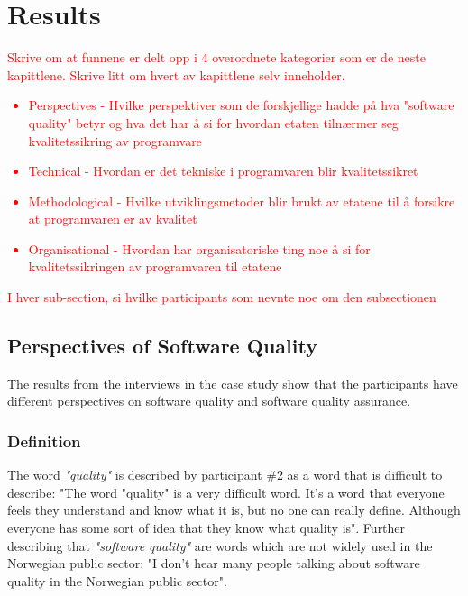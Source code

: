 \chapter{Results}

\textcolor{red}{Skrive om at funnene er delt opp i 4 overordnete kategorier som er de neste kapittlene. Skrive litt om hvert av kapittlene selv inneholder.
\begin{itemize}
    \item Perspectives - Hvilke perspektiver som de forskjellige hadde på hva "software quality" betyr og hva det har å si for hvordan etaten tilnærmer seg kvalitetssikring av programvare
    \item Technical - Hvordan er det tekniske i programvaren blir kvalitetssikret
    \item Methodological - Hvilke utviklingsmetoder blir brukt av etatene til å forsikre at programvaren er av kvalitet
    \item Organisational - Hvordan har organisatoriske ting noe å si for kvalitetssikringen av programvaren til etatene
\end{itemize}
}

\textcolor{red}{I hver sub-section, si hvilke participants som nevnte noe om den subsectionen}

\section{Perspectives of Software Quality}
The results from the interviews in the case study show that the participants have different perspectives on software quality and software quality assurance.

\subsection{Definition}
The word \textit{"quality"} is described by participant \#2 as a word that is difficult to describe: "The word "quality" is a very difficult word. It's a word that everyone feels they understand and know what it is, but no one can really define. Although everyone has some sort of idea that they know what quality is". Further describing that \textit{"software quality"} are words which are not widely used in the Norwegian public sector: "I don't hear many people talking about software quality in the Norwegian public sector".


